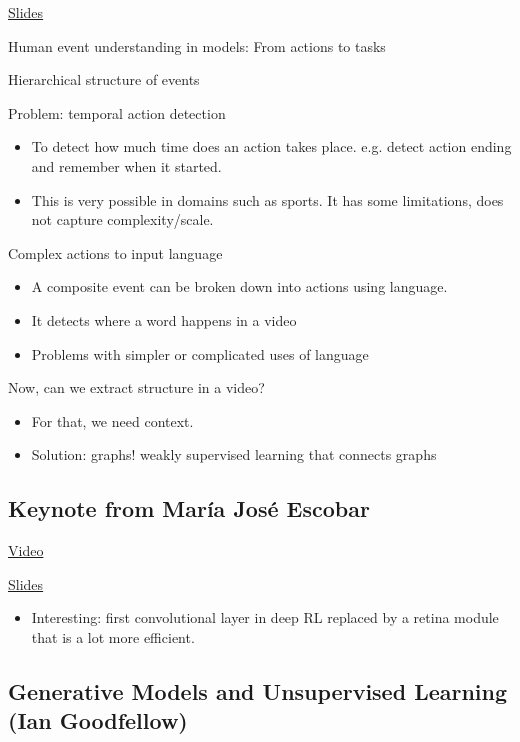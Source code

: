 \documentclass[12pt, english]{article}
\begin{document}
\href{https://drive.google.com/file/d/1DGQOyNvwUVC6BSQjNMdQJbTK3ys6b8BX/view?usp=sharing}{Slides}

Human event understanding in models: From actions to tasks

Hierarchical structure of events

Problem: temporal action detection
\begin{itemize}
\item To detect how much time does an action takes place. e.g. detect action ending and remember when it started.
\item This is very possible in domains such as sports. It has some limitations, does not capture complexity/scale.
\end{itemize}

Complex actions to input language
\begin{itemize}
\item A composite event can be broken down into actions using language.
\item It detects where a word happens in a video
\item Problems with simpler or complicated uses of language
\end{itemize}

Now, can we extract structure in a video?
\begin{itemize}
\item For that, we need context.
\item Solution: graphs! weakly supervised learning that connects graphs
\end{itemize}

\subsection{Keynote from María José Escobar}
\href{http://tv.vera.com.uy/video/55279}{Video}

\href{https://drive.google.com/file/d/1btEyrDjJLbD-iV-z3q1llj-LoGDvbrek/view?usp=sharing}{Slides}


\begin{itemize}
\item Interesting: first convolutional layer in deep RL replaced by a retina module that is a lot more efficient.
\end{itemize}


\subsection{Generative Models and Unsupervised Learning (Ian Goodfellow)}
\end{document}
